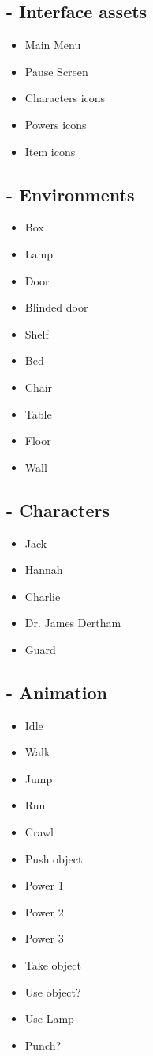 \subsection{- Interface assets}
\begin{itemize}  
\item Main Menu
\item Pause Screen
\item Characters icons
\item Powers icons
\item Item icons
\end{itemize}


\subsection{- Environments}
\begin{itemize}  
\item Box
\item Lamp
\item Door
\item Blinded door
\item Shelf
\item Bed
\item Chair
\item Table
\item Floor
\item Wall
\end{itemize}
        
\subsection{- Characters}
\begin{itemize}  
\item Jack
\item Hannah
\item Charlie
\item Dr. James Dertham
\item Guard
\end{itemize}

\subsection{- Animation}
\begin{itemize}  
\item Idle
\item Walk
\item Jump
\item Run
\item Crawl
\item Push object
\item Power 1
\item Power 2
\item Power 3
\item Take object
\item Use object?
\item Use Lamp
\item Punch?
\end{itemize}

